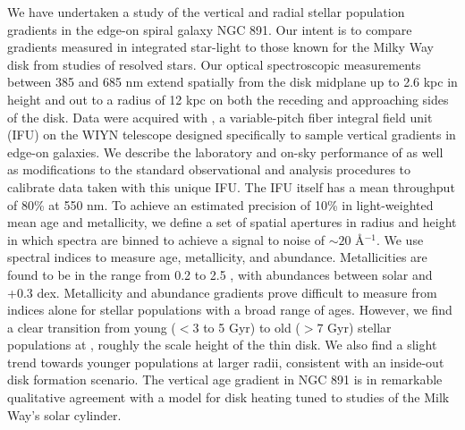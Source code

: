 \begin{chabstract}

We have undertaken a study of the vertical and radial stellar
population gradients in the edge-on spiral galaxy NGC 891. Our intent
is to compare gradients measured in integrated star-light to those
known for the Milky Way disk from studies of resolved stars.  Our
optical spectroscopic measurements between 385 and 685 nm extend
spatially from the disk midplane up to 2.6 kpc in height and out to a
radius of 12 kpc on both the receding and approaching sides of the
disk. Data were acquired with \GP, a variable-pitch fiber integral
field unit (IFU) on the WIYN telescope designed specifically to sample
vertical gradients in edge-on galaxies. We describe the laboratory and
on-sky performance of \GP as well as modifications to the standard
observational and analysis procedures to calibrate data taken with
this unique IFU. The IFU itself has a mean throughput of 80\% at 550
nm. To achieve an estimated precision of 10\% in light-weighted mean
age and metallicity, we define a set of spatial apertures in radius
and height in which spectra are binned to achieve a signal to noise of
$\sim 20$ \AA$^{-1}$. We use spectral indices to measure age,
metallicity, and abundance. Metallicities are found to be in the range
from 0.2 to 2.5 \Zsol, with abundances between solar and +0.3
dex. Metallicity and abundance gradients prove difficult to measure
from indices alone for stellar populations with a broad range of
ages. However, we find a clear transition from young ($<3$ to 5 Gyr) to
old ($> 7$ Gyr) stellar populations at , roughly the
scale height of the thin disk. We also find a slight trend towards
younger populations at larger radii, consistent with an inside-out
disk formation scenario.  The vertical age gradient in NGC 891 is in
remarkable qualitative agreement with a model for disk heating tuned
to studies of the Milk Way's solar cylinder.


\end{chabstract}
\cleardoublepage

